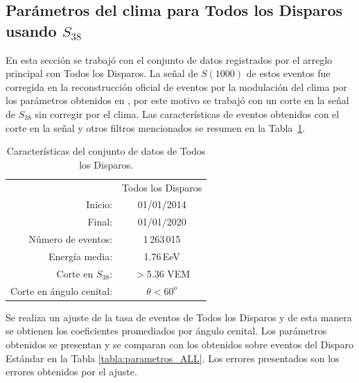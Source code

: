 \subsection{Parámetros del clima para Todos los Disparos usando $S_{38}$}


En esta sección se trabajó con el conjunto de datos registrados por el arreglo principal con Todos los Disparos. La señal de $S(1000)$ de estos eventos fue corregida en la reconstrucción oficial de eventos por la modulación del clima por los parámetros obtenidos en \cite{aab2017impact}, por este motivo se trabajó con un corte en la señal de $S_{38}$ sin corregir por el clima. Las características de eventos obtenidos con el corte en la señal y otros filtros mencionados se resumen en la Tabla~\ref{tabla:caracteristicas_ALL}. 

\begin{table}[H]
  \centering
  \begin{tabular}{r|c|}
    \cline{2-2}
                & Todos los Disparos \\ \cline{2-2}
  Inicio:              & 01/01/2014\\ 
  Final:               & 01/01/2020       							\\ 
  Número de eventos:   & 1\,263\,015							\\ 
  Energía media:       & 1.76\,EeV       				\\  %
  Corte en $S_{38}$:   & $>$5.36 VEM        				\\ 
  Corte en ángulo cenital:& $\theta < 60^o$ 				\\ \cline{2-2}
  \end{tabular}
\caption{Características del conjunto de datos de Todos los Disparos.} \label{tabla:caracteristicas_ALL}
\end{table}

Se realiza un ajuste de la tasa de eventos de Todos los Disparos y de esta manera se obtienen los coeficientes promediados por ángulo cenital. Los parámetros obtenidos se presentan y se comparan con los obtenidos sobre eventos del Disparo Estándar \cite{aab2017impact} en la Tabla \ref{tabla:parametros_ALL}. Los errores presentados son los errores obtenidos por el ajuste.  

